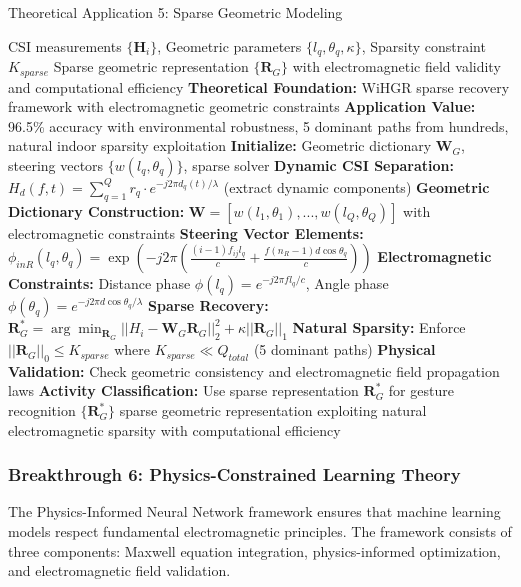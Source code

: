 \documentclass[journal]{IEEEtran}
\begin{document}
\begin{algorithm}[h]
\caption{Theoretical Application 5: Sparse Geometric Modeling}
\label{alg:sparse_geometric_modeling}
\begin{algorithmic}[1]
\REQUIRE CSI measurements $\{\mathbf{H}_i\}$, Geometric parameters $\{l_q, \theta_q, \kappa\}$, Sparsity constraint $K_{sparse}$
\ENSURE Sparse geometric representation $\{\mathbf{R}_G\}$ with electromagnetic field validity and computational efficiency
\STATE \textbf{Theoretical Foundation:} WiHGR sparse recovery framework \cite{meng2021wihgr} with electromagnetic geometric constraints
\STATE \textbf{Application Value:} 96.5\% accuracy with environmental robustness, 5 dominant paths from hundreds, natural indoor sparsity exploitation
\STATE \textbf{Initialize:} Geometric dictionary $\mathbf{W}_G$, steering vectors $\{w(l_q, \theta_q)\}$, sparse solver
\STATE \textbf{Dynamic CSI Separation:} $H_d(f,t) = \sum_{q=1}^Q r_q \cdot e^{-j2\pi d_q(t)/\lambda}$ (extract dynamic components)
\STATE \textbf{Geometric Dictionary Construction:} $\mathbf{W} = [w(l_1, \theta_1), ..., w(l_Q, \theta_Q)]$ with electromagnetic constraints
\STATE \textbf{Steering Vector Elements:} $\phi_{inR}(l_q, \theta_q) = \exp\left(-j2\pi\left(\frac{(i-1)f_{ij}l_q}{c} + \frac{f(n_R-1)d\cos \theta_q}{c}\right)\right)$
\STATE \textbf{Electromagnetic Constraints:} Distance phase $\phi(l_q) = e^{-j2\pi f l_q/c}$, Angle phase $\phi(\theta_q) = e^{-j2\pi d \cos\theta_q/\lambda}$
\STATE \textbf{Sparse Recovery:} $\mathbf{R}_G^* = \arg\min_{\mathbf{R}_G} ||H_i - \mathbf{W}_G \mathbf{R}_G||_2^2 + \kappa ||\mathbf{R}_G||_1$
\STATE \textbf{Natural Sparsity:} Enforce $||\mathbf{R}_G||_0 \leq K_{sparse}$ where $K_{sparse} \ll Q_{total}$ (5 dominant paths)
\STATE \textbf{Physical Validation:} Check geometric consistency and electromagnetic field propagation laws
\STATE \textbf{Activity Classification:} Use sparse representation $\mathbf{R}_G^*$ for gesture recognition
\RETURN $\{\mathbf{R}_G^*\}$ sparse geometric representation exploiting natural electromagnetic sparsity with computational efficiency
\end{algorithmic}
\end{algorithm}

\subsubsection{Breakthrough 6: Physics-Constrained Learning Theory}

The Physics-Informed Neural Network framework \cite{raissi2019physics,luo2025physics} ensures that machine learning models respect fundamental electromagnetic principles. The framework consists of three components: Maxwell equation integration, physics-informed optimization, and electromagnetic field validation.
\end{document}
